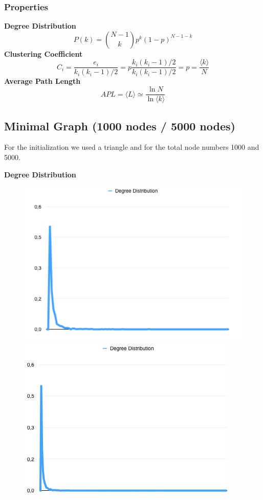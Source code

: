 \documentclass[a4paper,titlepage,11pt]{article}
\begin{document}
\subsubsection{Properties}
\textbf{Degree Distribution}
\[
  P(k) = {{N-1}\choose{k}} p^{k}(1-p)^{N-1-k}
\]
\textbf{Clustering Coefficient}
\[
  C_i = \frac{e_i}{k_i(k_i-1)/2} = p \frac{k_i(k_i-1)/2}{k_i(k_i-1)/2} = p = \frac{\langle k\rangle}{N}
\]
\textbf{Average Path Length}
\[
  APL = \langle L\rangle \simeq \frac{\ln{N}}{\ln{\langle k\rangle}}
\]

\subsection{Minimal Graph (1000 nodes / 5000 nodes)}
For the initialization we used a triangle and for the total node numbers 1000 and 5000.

\textbf{Degree Distribution}

\begin{figure}[h]
    \centering
    \includegraphics[scale=0.50]{img/dd-minimal-3-1000.png}
    \includegraphics[scale=0.50]{img/dd-minimal-3-5000.png}
\end{figure}
\end{document}
